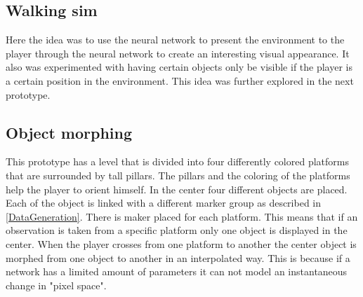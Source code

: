 \subsection{Walking sim}
Here the idea was to use the neural network to present the environment to the player through the neural network to create an interesting visual appearance. It also was experimented with having certain objects only be visible if the player is a certain position in the environment. This idea was further explored in the next prototype.



\subsection{Object morphing}
This prototype has a level that is divided into four differently colored platforms that are surrounded by tall pillars. The pillars and the coloring of the platforms help the player to orient himself. In the center four different objects are placed. Each of the object is linked with a different marker group as described in \cref{DataGeneration}. There is maker placed for each platform. This means that if an observation is taken from a specific platform only one object is displayed in the center. When the player crosses from one platform to another the center object is morphed from one object to another in an interpolated way. This is because if a network has a limited amount of parameters it can not model an instantaneous change in "pixel space".


